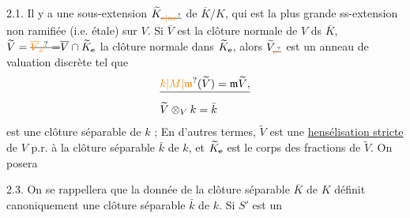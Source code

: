 2.1. Il y a une sous-extension \(\widetilde K_{\deleted{\unsure{e|nr}}}\) de \(\overline K/K\), qui est la plus grande ss-extension non ramifiée (i.e. étale)  sur \(V\). Si  \(\overline V\) est la clôture normale de \(V\) ds \(\overline K\), \(\widetilde V=\deleted{\unsure{\overline V_e}=}\overline V\cap\widetilde K_{\deleted{e}}\) la clôture normale dans \(\widetilde K_{\deleted{e}}\), alors \(\widetilde V_{\deleted{\unsure{e}}}\) est un anneau de valuation discrète tel que
\[
\begin{aligned}
&\deleted{\unsure{k|M|\mathfrak m}(\widetilde V)=\mathfrak m\widetilde V,}\\
&\widetilde V\otimes_V k=\bar k
\end{aligned}
\]
est une  clôture séparable de \(k\) ; En d'autres termes, \(\widetilde V\) est une \uline{hensélisation stricte} de \(V\) p.r. à  la  clôture séparable \(\bar k\) de \(k\), et \(\widetilde K_{\deleted{e}}\) est le corps des fractions de \(\widetilde V\). On posera 

\margin{\(\circ\mathrel{-}\)} 2.3. On se rappellera que  la donnée de la clôture séparable \(\overline K\) de \(K\) définit canoniquement une clôture séparable \(\bar k\) de \(k\).  Si \(S'\) est un


